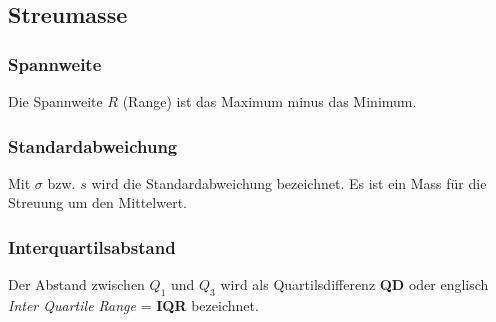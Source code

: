 \begin{multicols}{2}
\subsection*{Streumasse}
\subsubsection*{Spannweite}
Die Spannweite $R$ (Range) ist das Maximum minus
das Minimum.
\subsubsection*{Standardabweichung}
Mit $\sigma$ bzw. $s$ wird die Standardabweichung bezeichnet. Es ist
ein Mass für die Streuung um den Mittelwert.


\subsubsection*{Interquartilsabstand}
Der Abstand zwischen $Q_1$ und $Q_3$ wird als
Quartilsdifferenz \textbf{QD} oder
englisch \textit{Inter Quartile Range} = \textbf{IQR} bezeichnet.



\headerUndFooterJedeSeite{}

%
\headerUndFooterJedeSeite{}


\end{multicols}
